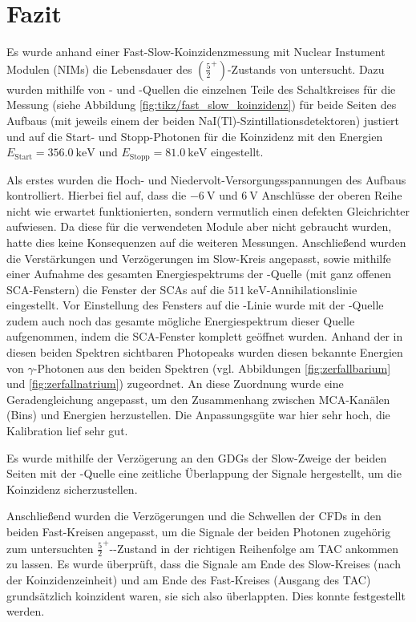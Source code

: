 \chapter{Fazit}

Es wurde anhand einer Fast-Slow-Koinzidenzmessung mit Nuclear Instument Modulen (NIMs) die Lebensdauer des $(\frac{5}{2}^+)$-Zustands von \caesium untersucht. Dazu wurden mithilfe von \na- und \ba-Quellen die einzelnen Teile des Schaltkreises für die Messung (siehe Abbildung \ref{fig:tikz/fast_slow_koinzidenz}) für beide Seiten des Aufbaus (mit jeweils einem der beiden NaI(Tl)-Szintillationsdetektoren) justiert und auf die Start- und Stopp-Photonen für die Koinzidenz mit den Energien $E_\text{Start}=\SI{356.0}{\kilo\eV}$ und $E_\text{Stopp}=\SI{81.0}{\kilo\eV}$ eingestellt.

Als erstes wurden die Hoch- und Niedervolt-Versorgungsspannungen des Aufbaus kontrolliert. Hierbei fiel auf, dass die $\SI{-6}{\V}$ und $\SI{6}{\V}$ Anschlüsse der oberen Reihe nicht wie erwartet funktionierten, sondern vermutlich einen defekten Gleichrichter aufwiesen. Da diese für die verwendeten Module aber nicht gebraucht wurden, hatte dies keine Konsequenzen auf die weiteren Messungen.
Anschließend wurden die Verstärkungen und Verzögerungen im Slow-Kreis angepasst, sowie mithilfe einer Aufnahme des gesamten Energiespektrums der \na-Quelle (mit ganz offenen SCA-Fenstern) die Fenster der SCAs auf die $\SI{511}{\kilo\eV}$-Annihilationslinie eingestellt. Vor Einstellung des Fensters auf die \na-Linie wurde mit der \ba-Quelle zudem auch noch das gesamte mögliche Energiespektrum dieser Quelle aufgenommen, indem die SCA-Fenster komplett geöffnet wurden. Anhand der in diesen beiden Spektren sichtbaren Photopeaks wurden diesen bekannte Energien von $\gamma$-Photonen aus den beiden Spektren (vgl. Abbildungen \ref{fig:zerfallbarium} und \ref{fig:zerfallnatrium}) zugeordnet. An diese Zuordnung wurde eine Geradengleichung angepasst, um den Zusammenhang zwischen MCA-Kanälen (Bins) und Energien herzustellen. Die Anpassungsgüte war hier sehr hoch, die Kalibration lief sehr gut.

Es wurde mithilfe der Verzögerung an den GDGs der Slow-Zweige der beiden Seiten mit der \na-Quelle eine zeitliche Überlappung der Signale hergestellt, um die Koinzidenz sicherzustellen.

Anschließend wurden die Verzögerungen und die Schwellen der CFDs in den beiden Fast-Kreisen angepasst, um die Signale der beiden Photonen zugehörig zum untersuchten $\frac{5}{2}^+$-\caesium-Zustand in der richtigen Reihenfolge am TAC ankommen zu lassen. Es wurde überprüft, dass die Signale am Ende des Slow-Kreises (nach der Koinzidenzeinheit) und am Ende des Fast-Kreises (Ausgang des TAC) grundsätzlich koinzident waren, sie sich also überlappten. Dies konnte festgestellt werden.

